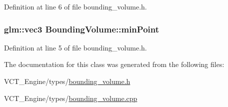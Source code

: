 Definition at line 6 of file bounding\+\_\+volume.\+h.

\hypertarget{class_bounding_volume_a51528200bd834159d593a7bb6b78b8df}{}
\subsubsection[{min\+Point}]{\setlength{\rightskip}{0pt plus 5cm}glm\+::vec3 Bounding\+Volume\+::min\+Point}\label{class_bounding_volume_a51528200bd834159d593a7bb6b78b8df}


Definition at line 5 of file bounding\+\_\+volume.\+h.



The documentation for this class was generated from the following files\+:\begin{DoxyCompactItemize}
\item 
V\+C\+T\+\_\+\+Engine/types/\hyperlink{bounding__volume_8h}{bounding\+\_\+volume.\+h}\item 
V\+C\+T\+\_\+\+Engine/types/\hyperlink{bounding__volume_8cpp}{bounding\+\_\+volume.\+cpp}\end{DoxyCompactItemize}

